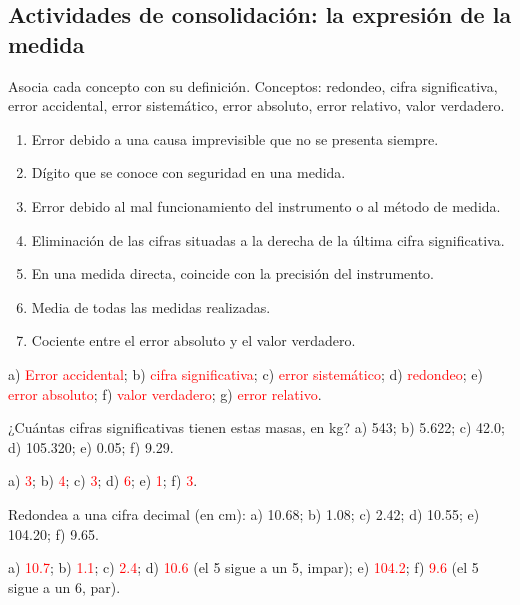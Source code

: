 \subsection*{Actividades de consolidación: la expresión de la medida}

\begin{exercise}
    Asocia cada concepto con su definición. Conceptos: redondeo, cifra significativa, error accidental, error sistemático, error absoluto, error relativo, valor verdadero.
    \begin{enumerate}[label=\alph*)]
        \item Error debido a una causa imprevisible que no se presenta siempre.
        \item Dígito que se conoce con seguridad en una medida.
        \item Error debido al mal funcionamiento del instrumento o al método de medida.
        \item Eliminación de las cifras situadas a la derecha de la última cifra significativa.
        \item En una medida directa, coincide con la precisión del instrumento.
        \item Media de todas las medidas realizadas.
        \item Cociente entre el error absoluto y el valor verdadero.
    \end{enumerate}
    \begin{solu}
        a) \textcolor{red}{Error accidental}; b) \textcolor{red}{cifra significativa}; c) \textcolor{red}{error sistemático}; d) \textcolor{red}{redondeo}; e) \textcolor{red}{error absoluto}; f) \textcolor{red}{valor verdadero}; g) \textcolor{red}{error relativo}.
    \end{solu}
\end{exercise}

\begin{exercise}
    ¿Cuántas cifras significativas tienen estas masas, en kg? a) 543; b) \num{5.622}; c) \num{42.0}; d) \num{105.320}; e) \num{0.05}; f) \num{9.29}.
    \begin{solu}
        a) \textcolor{red}{3}; b) \textcolor{red}{4}; c) \textcolor{red}{3}; d) \textcolor{red}{6}; e) \textcolor{red}{1}; f) \textcolor{red}{3}.
    \end{solu}
\end{exercise}

\begin{exercise}
    Redondea a una cifra decimal (en cm): a) \num{10.68}; b) \num{1.08}; c) \num{2.42}; d) \num{10.55}; e) \num{104.20}; f) \num{9.65}.
    \begin{solu}
        a) \textcolor{red}{\num{10.7}}; b) \textcolor{red}{\num{1.1}}; c) \textcolor{red}{\num{2.4}}; d) \textcolor{red}{\num{10.6}} (el 5 sigue a un 5, impar); e) \textcolor{red}{\num{104.2}}; f) \textcolor{red}{\num{9.6}} (el 5 sigue a un 6, par).
    \end{solu}
\end{exercise}


